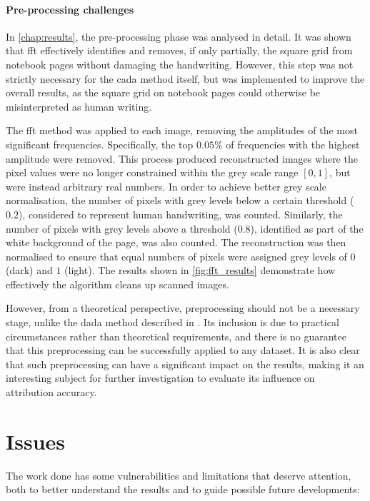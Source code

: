 \begin{toReview}
\paragraph{Pre-processing challenges} In \cref{chap:results}, the pre-processing phase was analysed in detail. It was shown that \gls{fft} effectively identifies and removes, if only partially, the square grid from notebook pages without damaging the handwriting. However, this step was not strictly necessary for the \gls{cada} method itself, but was implemented to improve the overall results, as the square grid on notebook pages could otherwise be misinterpreted as human writing.

\noindent The \gls{fft} method was applied to each image, removing the amplitudes of the most significant frequencies. Specifically, the top $0.05\%$ of frequencies with the highest amplitude were removed. This process produced reconstructed images where the pixel values were no longer constrained within the grey scale range $\left[0,1\right]$, but were instead arbitrary real numbers. In order to achieve better grey scale normalisation, the number of pixels with grey levels below a certain threshold ($0.2$), considered to represent human handwriting, was counted. Similarly, the number of pixels with grey levels above a threshold ($0.8$), identified as part of the white background of the page, was also counted. The reconstruction was then normalised to ensure that equal numbers of pixels were assigned grey levels of $0$ (dark) and $1$ (light). The results shown in \cref{fig:fft_results} demonstrate how effectively the algorithm cleans up scanned images.

\noindent However, from a theoretical perspective, preprocessing should not be a necessary stage, unlike the \gls{dada} method described in \cite{thesis}. Its inclusion is due to practical circumstances rather than theoretical requirements, and there is no guarantee that this preprocessing can be successfully applied to any dataset. It is also clear that such preprocessing can have a significant impact on the results, making it an interesting subject for further investigation to evaluate its influence on attribution accuracy.

\section{Issues}

The work done has some vulnerabilities and limitations that deserve attention, both to better understand the results and to guide possible future developments:


\end{toReview}
